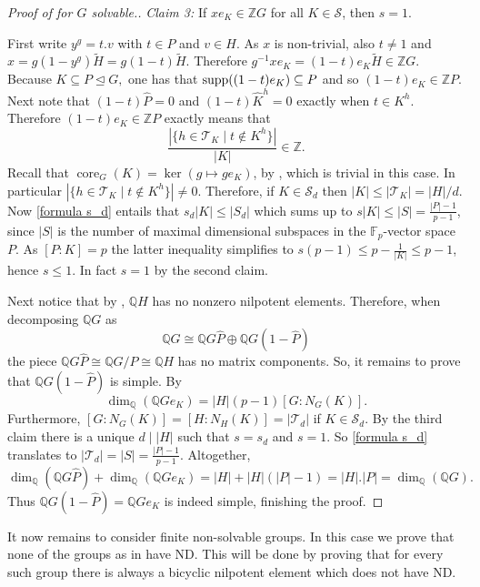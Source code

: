 \documentclass[a4paper,10pt]{amsart}
\theoremstyle{definition}
\theoremstyle{remark}
\newcommand\supp{{\rm supp}}
\newcommand{\Z}{{\mathbb Z}}
\newcommand{\Q}{{\mathbb Q}}
\begin{document}
\begin{proof}[Proof of  for $G$ solvable.]
{\it Claim 3:} If $x e_K \in \Z G$ for all $K \in \mathcal{S}$, then $s = 1$. 

\noindent First write $y^g = t . v$ with $t \in P$ and $v \in H$. As $x$ is non-trivial, also $t \neq 1$ and $x = g (1 -y^{g}) \widetilde{H}= g (1- t) \widetilde{H}$. Therefore $ g^{-1}x e_{K} = (1-t) e_K \widetilde{H} \in \Z G.$ Because $K \subseteq P \unlhd G,$ one has that ${\supp}( (1-t)e_K )\subseteq P$ and so $(1-t)e_K \in \Z P$. Next note that $(1-t) \widehat{P} =0$ and $(1-t)\widehat{K}^h=0$ exactly when $t \in K^h$. Therefore $(1-t)e_K \in \Z P$ exactly means that
$$\frac{|\{ h\in \mathcal{T}_K \mid t \notin K^{h} \}|}{|K|} \in \Z.$$
Recall that $\operatorname{core}_G(K) = \ker \left( g \mapsto g e_K \right)$, by , which is trivial in this case. In particular $|\{ h\in \mathcal{T}_K \mid t \notin K^{h} \}| \neq 0.$
Therefore, if $K \in \mathcal{S}_d$ then $|K| \leq |\mathcal{T}_K| = |H|/d$.  Now \eqref{formula s_d} entails that $s_d |K| \leq |S_d|$ which sums up to $s |K| \leq |S| = \frac{|P|-1}{p-1}$, since $|S|$ is the number of maximal dimensional subspaces in the $\mathbb{F}_p$-vector space $P$.  As $[P:K]=p$ the latter inequality simplifies to $s (p-1) \leq p - \frac{1}{|K|} \leq p-1$, hence $s \leq 1.$ In fact $s=1$ by the second claim.

Next notice that by \cite[Lemma 3.3]{JespersSun}, $\Q H$ has no nonzero nilpotent elements. Therefore, when decomposing $\Q G$ as
$$\Q G \cong \Q G \widehat{P} \oplus \Q G (1-\widehat{P})$$
the piece $\Q G \widehat{P} \cong \Q G/P \cong \Q H$ has no matrix components. So, it remains to prove that $\Q G (1-\widehat{P})$ is simple. 
By 
$$\dim_{\Q }(\Q G e_K) = |H| (p-1) [G:N_G(K)].$$
Furthermore, $[G:N_G(K)] = [H: N_H(K)] = |\mathcal{T}_d|$ if $K \in \mathcal{S}_d$. By the third claim there is a unique $d \mid |H|$ such that $s = s_d$ and $s=1$. So  \eqref{formula s_d} translates to $|\mathcal{T}_d| = |S| = \frac{|P|-1}{p-1}.$ Altogether,
$$\dim_{\Q}(\Q G\widehat{P}) + \dim_{\Q }(\Q G e_K) = |H| +  |H| (|P| -1) = |H| . |P| = \dim_{\Q}(\Q G).$$
Thus $\Q G (1 - \widehat{P}) = \Q G e_K$ is indeed simple, finishing the proof.
\end{proof}

It now remains to consider finite non-solvable groups. In this case we prove that none of the groups as in  have ND. This will be done by proving that for every such group there is always a bicyclic nilpotent element which does not have ND. 
\end{document}

